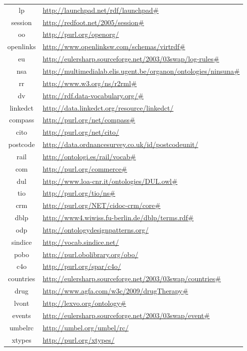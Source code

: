 \documentclass{article}
\begin{document}
\begin{longtable}{ c | p{8cm} }
lp & \url{http://launchpad.net/rdf/launchpad#} \\
session & \url{http://redfoot.net/2005/session#} \\
oo & \url{http://purl.org/openorg/} \\
openlinks & \url{http://www.openlinksw.com/schemas/virtrdf#} \\
eu & \url{http://eulersharp.sourceforge.net/2003/03swap/log-rules#} \\
nsa & \url{http://multimedialab.elis.ugent.be/organon/ontologies/ninsuna#} \\
rr & \url{http://www.w3.org/ns/r2rml#} \\
dv & \url{http://rdf.data-vocabulary.org/#} \\
linkedct & \url{http://data.linkedct.org/resource/linkedct/} \\
compass & \url{http://purl.org/net/compass#} \\
cito & \url{http://purl.org/net/cito/} \\
postcode & \url{http://data.ordnancesurvey.co.uk/id/postcodeunit/} \\
rail & \url{http://ontologi.es/rail/vocab#} \\
com & \url{http://purl.org/commerce#} \\
dul & \url{http://www.loa-cnr.it/ontologies/DUL.owl#} \\
tio & \url{http://purl.org/tio/ns#} \\
crm & \url{http://purl.org/NET/cidoc-crm/core#} \\
dblp & \url{http://www4.wiwiss.fu-berlin.de/dblp/terms.rdf#} \\
odp & \url{http://ontologydesignpatterns.org/} \\
sindice & \url{http://vocab.sindice.net/} \\
pobo & \url{http://purl.obolibrary.org/obo/} \\
c4o & \url{http://purl.org/spar/c4o/} \\
countries & \url{http://eulersharp.sourceforge.net/2003/03swap/countries#} \\
drug & \url{http://www.agfa.com/w3c/2009/drugTherapy#} \\
lvont & \url{http://lexvo.org/ontology#} \\
events & \url{http://eulersharp.sourceforge.net/2003/03swap/event#} \\
umbelrc & \url{http://umbel.org/umbel/rc/} \\
xtypes & \url{http://purl.org/xtypes/} \\

\end{longtable}
\end{document}
